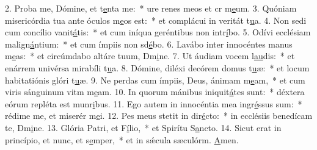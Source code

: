2. Proba me, Dómine, et t\uline{e}nta me:~* ure renes meos et cr m\uline{e}um.
3. Quóniam misericórdia tua ante óculos m\uline{e}os est:~* et complácui in veritát t\uline{u}a.
4. Non sedi cum concílio vanit\uline{á}tis:~* et cum iníqua geréntibus non intr\uline{í}bo.
5. Odívi ecclésiam malign\uline{á}ntium:~* et cum ímpiis non sd\uline{é}bo.
6. Lavábo inter innocéntes manus m\uline{e}as:~* et circúmdabo altáre tuum, Dm\uline{i}ne.
7. Ut áudiam vocem l\uline{au}dis:~* et enárrem univérsa mirabíli t\uline{u}a.
8. Dómine, diléxi decórem domus t\uline{u}æ:~* et locum habitatiónis glóri t\uline{u}æ.
9. Ne perdas cum ímpiis, Deus, ánimam m\uline{e}am,~* et cum viris sánguinum vitm m\uline{e}am.
10. In quorum mánibus iniquit\uline{á}tes sunt:~* déxtera eórum repléta est munr\uline{i}bus.
11. Ego autem in innocéntia mea ingr\uline{é}ssus sum:~* rédime me, et miserér m\uline{e}i.
12. Pes meus stetit in dir\uline{é}cto:~* in ecclésiis benedícam te, Dm\uline{i}ne.
13. Glória Patri, et F\uline{í}lio,~* et Spirítu S\uline{a}ncto.
14. Sicut erat in princípio, et nunc, et s\uline{e}mper,~* et in sǽcula sæculórm. \uline{A}men.
